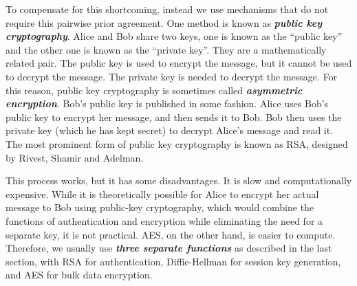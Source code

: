 To compensate for this shortcoming, instead we use mechanisms that do not require this pairwise prior agreement.
One method is known as \textbf{\emph{public key cryptography}}.
Alice and Bob share two keys, one is known as the ``public key'' and the other one is known as the ``private key''. 
They are a mathematically related pair.
The public key is used to encrypt the message, but it cannot be used to decrypt the message. 
The private key is needed to decrypt the message.
For this reason, public key cryptography is sometimes called \textbf{\emph{asymmetric encryption}}.
Bob's public key is published in some fashion.
Alice uses Bob's public key to encrypt her message, and then sends it to Bob.
Bob then uses the private key (which he has kept secret) to decrypt Alice's message and read it.
The most prominent form of public key cryptography is known as RSA, designed by Rivest, Shamir and Adelman.

This process works, but it has some disadvantages.
It is slow and computationally expensive.
While it is theoretically possible for Alice to encrypt her actual message to Bob using public-key cryptography, which would combine the functions of authentication and encryption while eliminating the need for a separate key, it is not practical. 
AES, on the other hand, is easier to compute.
Therefore, we usually use \textbf{\emph{three separate functions}} as described in the last section, with RSA for authentication, Diffie-Hellman for session key generation, and AES for bulk data encryption.

